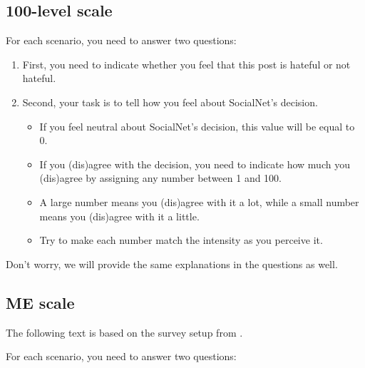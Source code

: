 \subsection{100-level scale}
For each scenario, you need to answer two questions:
\begin{enumerate}
    \item First, you need to indicate whether you feel that this post is hateful or not hateful.
    \item Second, your task is to tell how you feel about SocialNet's decision.
          \begin{itemize}
              \item If you feel neutral about SocialNet's decision, this value will be equal to 0.
              \item If you (dis)agree with the decision, you need to indicate how much you (dis)agree by assigning any number between 1 and 100.
              \item A large number means you (dis)agree with it a lot, while a small number means you (dis)agree with it a little.
              \item Try to make each number match the intensity as you perceive it.
          \end{itemize}
\end{enumerate}

\begin{flushleft}
    Don't worry, we will provide the same explanations in the questions as well.
\end{flushleft}

\subsection{ME scale}
The following text is based on the survey setup from \citet{moskowitz1977magnitude}.\\

\begin{flushleft}
    For each scenario, you need to answer two questions:
\end{flushleft}

